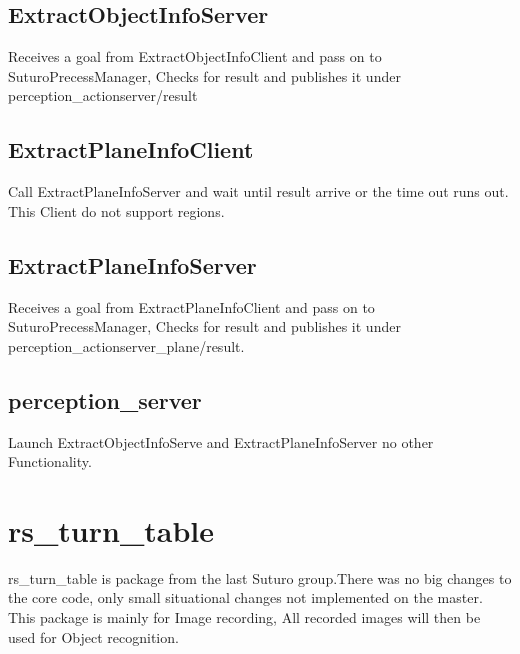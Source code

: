 \documentclass[main.tex]{subfiles}
\begin{document}
			\subsection{ExtractObjectInfoServer}
Receives a goal from ExtractObjectInfoClient and pass on to SuturoPrecessManager, Checks for result and publishes it under perception\_actionserver/result 

			\subsection{ExtractPlaneInfoClient}
Call ExtractPlaneInfoServer and wait until result arrive or the time out runs out. This Client do not support regions. 

			\subsection{ExtractPlaneInfoServer}
Receives a goal from ExtractPlaneInfoClient and pass on to SuturoPrecessManager, Checks for result and publishes it under perception\_actionserver\_plane/result.

			\subsection{perception\_server}
Launch ExtractObjectInfoServe and ExtractPlaneInfoServer no other Functionality.



		\section{rs\_turn\_table}
rs\_turn\_table is package from the last Suturo group.There was no big changes to the core code, only small situational changes not implemented on the master. 
This package is mainly for Image recording, All recorded images will then be used for Object recognition.  
\end{document}
